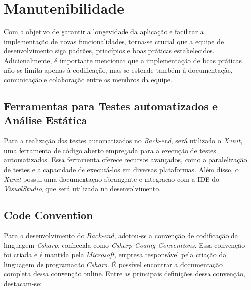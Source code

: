 \clearpage
\section{Manutenibilidade}

Com o objetivo de garantir a longevidade da aplicação e facilitar a implementação de novas funcionalidades, torna-se crucial que a equipe de desenvolvimento siga padrões, princípios e boas práticas estabelecidos. Adicionalmente, é importante mencionar que a implementação de boas práticas não se limita apenas à codificação, mas se estende também à documentação, comunicação e colaboração entre os membros da equipe.

\subsection{Ferramentas para Testes automatizados e Análise Estática}

Para a realização dos testes automatizados no \textit{\gls{Back-end}}, será utilizado o \textit{\gls{Xunit}}, uma ferramenta de código aberto empregada para a execução de testes automatizados. Essa ferramenta oferece recursos avançados, como a paralelização de testes e a capacidade de executá-los em diversas plataformas. Além disso, o \textit{\gls{Xunit}} possui uma documentação abrangente e integração com a \ac{IDE} do \textit{\gls{VisualStudio}}, que será utilizada no desenvolvimento.

\subsection{Code Convention}

Para o desenvolvimento do \textit{\gls{Back-end}}, adotou-se a convenção de codificação da linguagem \textit{\gls{Csharp}}, conhecida como \textit{Csharp Coding Conventions}. Essa convenção foi criada e é mantida pela \textit{\gls{Microsoft}}, empresa responsável pela criação da linguagem de programação \textit{\gls{Csharp}}. É possível encontrar a documentação completa dessa convenção online. Entre as principais definições dessa convenção, destacam-se:

